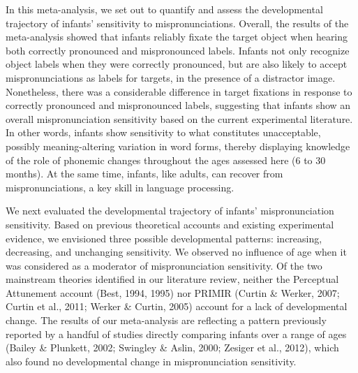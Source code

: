 \documentclass[man]{apa6}
\theoremstyle{definition}
\theoremstyle{definition}
\theoremstyle{definition}
\theoremstyle{remark}
\begin{document}
In this meta-analysis, we set out to quantify and assess the
developmental trajectory of infants' sensitivity to mispronunciations.
Overall, the results of the meta-analysis showed that infants reliably
fixate the target object when hearing both correctly pronounced and
mispronounced labels. Infants not only recognize object labels when they
were correctly pronounced, but are also likely to accept
mispronunciations as labels for targets, in the presence of a distractor
image. Nonetheless, there was a considerable difference in target
fixations in response to correctly pronounced and mispronounced labels,
suggesting that infants show an overall mispronunciation sensitivity
based on the current experimental literature. In other words, infants
show sensitivity to what constitutes unacceptable, possibly
meaning-altering variation in word forms, thereby displaying knowledge
of the role of phonemic changes throughout the ages assessed here (6 to
30 months). At the same time, infants, like adults, can recover from
mispronunciations, a key skill in language processing.

We next evaluated the developmental trajectory of infants'
mispronunciation sensitivity. Based on previous theoretical accounts and
existing experimental evidence, we envisioned three possible
developmental patterns: increasing, decreasing, and unchanging
sensitivity. We observed no influence of age when it was considered as a
moderator of mispronunciation sensitivity. Of the two mainstream
theories identified in our literature review, neither the Perceptual
Attunement account (Best, 1994, 1995) nor PRIMIR (Curtin \& Werker,
2007; Curtin et al., 2011; Werker \& Curtin, 2005) account for a lack of
developmental change. The results of our meta-analysis are reflecting a
pattern previously reported by a handful of studies directly comparing
infants over a range of ages (Bailey \& Plunkett, 2002; Swingley \&
Aslin, 2000; Zesiger et al., 2012), which also found no developmental
change in mispronunciation sensitivity.
\end{document}
